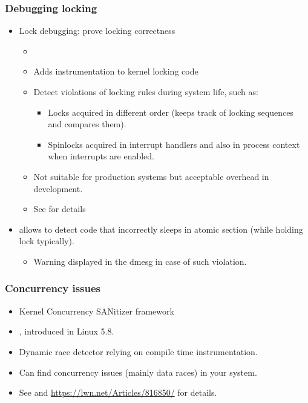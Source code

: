\begin{frame}
  \frametitle{Debugging locking}
  \begin{itemize}
  \item Lock debugging: prove locking correctness
    \begin{itemize}
    \item {}
    \item Adds instrumentation to kernel locking code
    \item Detect violations of locking rules during system life, such as:
      \begin{itemize}
      \item Locks acquired in different order (keeps track of locking
        sequences and compares them).
      \item Spinlocks acquired in interrupt handlers and also in
        process context when interrupts are enabled.
      \end{itemize}
    \item Not suitable for production systems but acceptable overhead
      in development.
    \item See  for details
    \end{itemize}
    \item {} allows to detect code that
      incorrectly sleeps in atomic section (while holding lock typically).
      \begin{itemize}
        \item Warning displayed in the dmesg in case of such violation.
        \end{itemize}
  \end{itemize}
\end{frame}

\begin{frame}
  \frametitle{Concurrency issues}
  \begin{itemize}
    \item Kernel Concurrency SANitizer framework
    \item {}, introduced in Linux 5.8.
    \item Dynamic race detector relying on compile time instrumentation. 
    \item Can find concurrency issues (mainly data races) in your system.
    \item See  and
        \url{https://lwn.net/Articles/816850/} for details.
  \end{itemize}
\end{frame}
